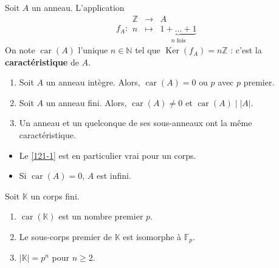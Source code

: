 
	\begin{definition}
		Soit $A$ un anneau. L'application
		\[
			f_A :
			\begin{array}{ccc}
				\mathbb{Z} &\rightarrow& A \\
				n &\mapsto& \underbrace{1 + \dots + 1}_{n \text{ fois}}
			\end{array}
		\]
		On note $\operatorname{car}(A)$ l'unique $n \in \mathbb{N}$ tel que $\operatorname{Ker}(f_A) = n\mathbb{Z}$ : c'est la \textbf{caractéristique} de $A$.
	\end{definition}

	\begin{proposition}
		\begin{enumerate}[label=(\roman*)]
			\item \label{121-1} Soit $A$ un anneau intègre. Alors, $\operatorname{car}(A) = 0 \text{ ou } p$ avec $p$ premier.
			\item Soit $A$ un anneau fini. Alors, $\operatorname{car}(A) \neq 0$ et $\operatorname{car}(A) \mid |A|$.
			\item Un anneau et un quelconque de ses sous-anneaux ont la même caractéristique.
		\end{enumerate}
	\end{proposition}

	\begin{remark}
		\begin{itemize}
			\item Le \cref{121-1} est en particulier vrai pour un corps.
			\item Si $\operatorname{car}(A) = 0$, $A$ est infini.
		\end{itemize}
	\end{remark}

	\reference{81}

	\begin{proposition}
		Soit $\mathbb{K}$ un corps fini.
		\begin{enumerate}[label=(\roman*)]
			\item $\operatorname{car}(\mathbb{K})$ est un nombre premier $p$.
			\item Le sous-corps premier de $\mathbb{K}$ est isomorphe à $\mathbb{F}_p$.
			\item $\vert \mathbb{K} \vert = p^n$ pour $n \geq 2$.
		\end{enumerate}
	\end{proposition}

